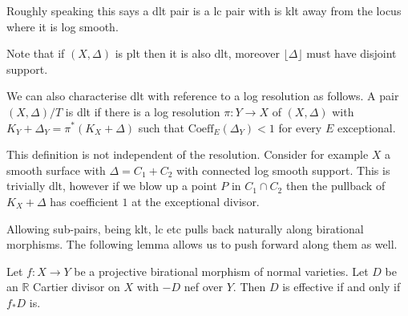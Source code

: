 \documentclass[a4paper,12pt]{book}
\begin{document}
Roughly speaking this says a dlt pair is a lc pair with is klt away from the locus where it is log smooth.

Note that if $(X,\Delta)$ is plt then it is also dlt, moreover $\lfloor \Delta \rfloor$ must have disjoint support.

\begin{remark}
	
	We can also characterise dlt with reference to a log resolution as follows. A pair $(X,\Delta)/T$ is dlt if there is a log resolution $\pi:Y \to X$ of $(X,\Delta)$ with $K_{Y}+\Delta_{Y}=\pi^{*}(K_{X}+\Delta)$ such that $\text{Coeff}_{E}(\Delta_{Y}) < 1$ for every $E$ exceptional.
	
	This definition is not independent of the resolution. Consider for example $X$ a smooth surface with $\Delta=C_{1}+C_{2}$ with connected log smooth support. This is trivially dlt, however if we blow up a point $P$ in $C_{1}\cap C_{2}$ then the pullback of $K_{X}+\Delta$ has coefficient $1$ at the exceptional divisor.

\end{remark}

Allowing sub-pairs, being klt, lc etc pulls back naturally along birational morphisms. The following lemma allows us to push forward along them as well.

\begin{lemma}
	Let $f:X \to Y$ be a projective birational morphism of normal varieties. Let $D$ be an $\mathbb{R}$ Cartier divisor on $X$ with $-D$ nef over $Y$. Then $D$ is effective if and only if $f_{*}D$ is.
\end{lemma}

%
\end{document}
